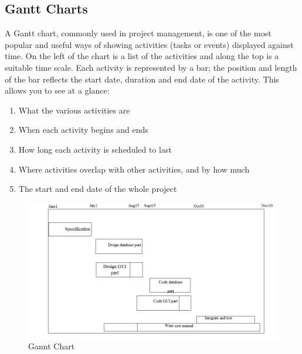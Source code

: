 \subsection{Gantt Charts}
A Gantt chart, commonly used in project management, is one of the most popular and useful ways of showing activities (tasks or events) displayed against time. On the left of the chart is a list of the activities and along the top is a suitable time scale. Each activity is represented by a bar; the position and length of the bar reflects the start date, duration and end date of the activity. This allows you to see at a glance:
\begin{enumerate}
\item What the various activities are
\item When each activity begins and ends
\item How long each activity is scheduled to last
\item Where activities overlap with other activities, and by how much
\item The start and end date of the whole project
\end{enumerate}
\vspace*{1cm}
\begin{figure}[!h]
\begin{center}
\includegraphics[scale=0.4]{images/ganttchart.png}
\end{center}
\caption{Gannt Chart}
\end{figure}
